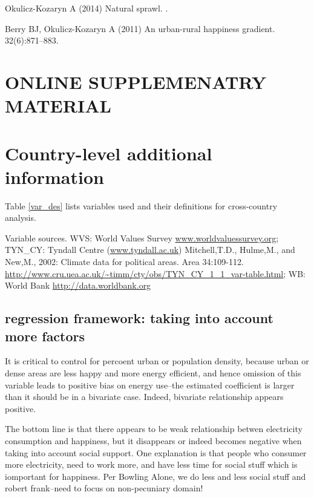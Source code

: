\documentclass[10pt, letterpaper]{article}
\begin{document}
\begin{spacing}{1.4}
\begin{thebibliography}{10}
Okulicz-Kozaryn A (2014) Natural sprawl.
.

Berry BJ, Okulicz-Kozaryn A (2011) An urban-rural happiness gradient.
 32(6):871--883.

\end{thebibliography}




\newpage
\section{\huge ONLINE SUPPLEMENATRY MATERIAL}

\tableofcontents

\section{Country-level additional information}

Table
\ref{var_des} lists variables used and their definitions for cross-country
analysis. 



{\scriptsize \noindent Variable sources. WVS: World Values Survey \url{www.worldvaluessurvey.org};
TYN\_CY: Tyndall Centre (\url{www.tyndall.ac.uk}) Mitchell,T.D., Hulme,M., and
New,M., 2002: Climate data for political areas. Area
34:109-112. \url{http://www.cru.uea.ac.uk/~timm/cty/obs/TYN_CY_1_1_var-table.html};
WB: World Bank \url{http://data.worldbank.org}}



\subsection{regression framework: taking into account more factors} 

It is critical to control for percoent urban or population density, because
urban or dense areas are less happy and more energy efficient, and hence
omission of this variable leads to positive bias on energy use--the estimated
coefficient   is larger than it should be in a bivariate case. Indeed, bivariate
relationship appears positive. 

The bottom line is that there appears to be weak relationship betwen electricity
consumption and happiness, but it disappears or indeed becomes negative when
taking into account social support. One explanation is that people who consumer
more electricity, need to work more, and have less time for social stuff which
is iomportant for happiness. Per Bowling Alone, we do less and less social stuff
and robert frank--need to focus on non-pecuniary domain!


\end{spacing}
\end{document}
